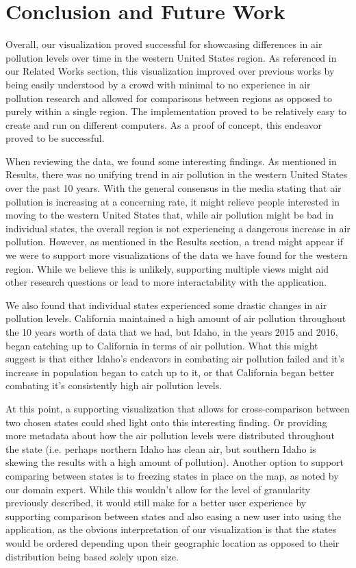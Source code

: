 \documentclass[journal]{vgtc}                %
\begin{document}
\section{Conclusion and Future Work}

Overall, our visualization proved successful for showcasing differences
in air pollution levels over time in the western United States region.
As referenced in our Related Works section, this visualization improved
over previous works by being easily understood by a crowd with minimal to no experience in 
air pollution research
and allowed for comparisons between regions as opposed to purely within
a single region. The implementation proved to be relatively
easy to create and run on different computers. As a proof of concept, this endeavor proved to be
successful.

When reviewing the data, we found some interesting findings. As mentioned in Results, there was no unifying
trend in air pollution in the western United States over the past 10 years. With the general consensus in the media
stating that air pollution is increasing at a concerning rate, it might relieve people interested in
moving to the western United States that, while air pollution might be bad in individual states, the overall region
is not experiencing a dangerous increase in air pollution. However, as mentioned in the Results section, a trend might
appear if we were to support more visualizations of the data we have found for the western region. While we believe this is unlikely,
supporting multiple views might aid other research questions or lead to more interactability with the application.

We also found that individual states experienced some drastic changes in air pollution levels. California maintained a high amount of air pollution
throughout the 10 years worth of data that we had, but Idaho, in the years 2015 and 2016, began catching up to California in terms of air pollution.
What this might suggest is that either Idaho's endeavors in combating air pollution failed and it's increase in population began to catch up
to it, or that California began better combating it's consistently high air pollution levels.  

At this point, a supporting visualization
that allows for cross-comparison between two chosen states could shed light onto this interesting finding. Or providing more metadata about
how the air pollution levels were distributed throughout the state (i.e. perhaps northern Idaho has clean air, but southern Idaho is skewing the
results with a high amount of pollution). Another option to support comparing between states is to freezing states in place on the map, as
noted by our domain expert. While this wouldn't allow for the level of granularity previously described, it would still make for a better
user experience by supporting comparison between states and also easing a new user into using the application, as the obvious
interpretation of our visualization is that the states would be ordered depending upon their geographic location as opposed to their distribution
being based solely upon size.
\end{document}
